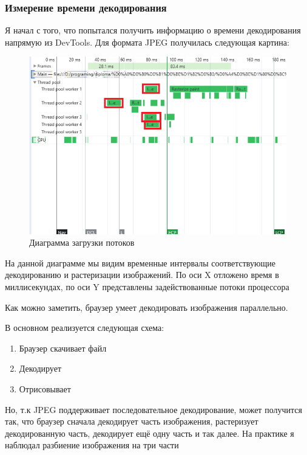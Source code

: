 \documentclass[12pt]{article}
\begin{document}
\subsubsection{Измерение времени декодирования}

Я начал с того, что попытался получить информацию о времени декодирования напрямую
из DevTools. Для формата JPEG получилась следующая картина:

\begin{figure}[H]
    \centering
    \includegraphics[width=1\textwidth]{../images/image_comp/devtools.png}
    \caption{Диаграмма загрузки потоков}
\end{figure}

На данной диаграмме мы видим временные интервалы соответствующие декодированию и растеризации изображений.
По оси X отложено время в миллисекундах, по оси Y представлены задействованные потоки процессора

Как можно заметить, браузер умеет декодировать изображения параллельно.

В основном реализуется следующая схема:

\begin{enumerate}
    \item Браузер скачивает файл
    \item Декодирует
    \item Отрисовывает
\end{enumerate}

Но, т.к JPEG поддерживает последовательное декодирование,
может получится так, что браузер сначала декодирует часть изображения,
растеризует декодированную часть, декодирует ещё одну часть и так далее.
На практике я наблюдал разбиение изображения на три части
\end{document}
